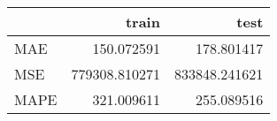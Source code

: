 \begin{tabular}{lrr}
\toprule
{} &          train &           test \\
\midrule
MAE  &     150.072591 &     178.801417 \\
MSE  &  779308.810271 &  833848.241621 \\
MAPE &     321.009611 &     255.089516 \\
\bottomrule
\end{tabular}
